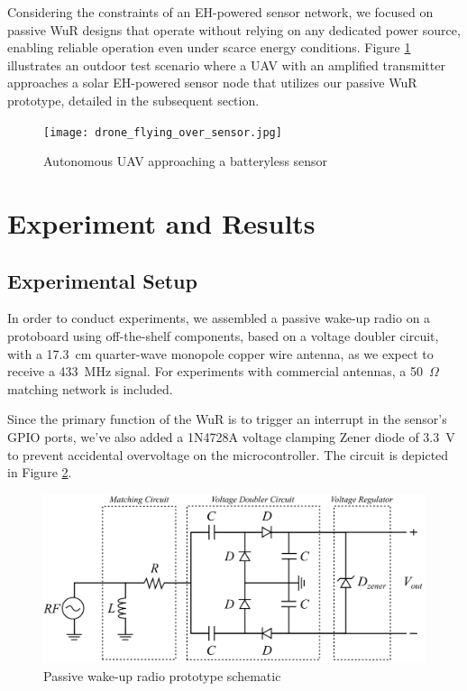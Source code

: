 \documentclass[conference]{IEEEtran}
\begin{document}
Considering the constraints of an EH-powered sensor network, we focused on passive WuR designs that operate without relying on any dedicated power source, enabling reliable operation even under scarce energy conditions. Figure \ref{fig:drone_over_sensor} illustrates an outdoor test scenario where a UAV with an amplified transmitter approaches a solar EH-powered sensor node that utilizes our passive WuR prototype, detailed in the subsequent section.

\begin{figure}[htbp]
  \centerline{\texttt{[image: drone\_flying\_over\_sensor.jpg]}}
  \caption{Autonomous UAV approaching a batteryless sensor}
  \label{fig:drone_over_sensor}
\end{figure}

\section{Experiment and Results}

\subsection{Experimental Setup}

In order to conduct experiments, we assembled a passive wake-up radio on a protoboard using off-the-shelf components, based on a voltage doubler circuit, with a 17.3~cm quarter-wave monopole copper wire antenna, as we expect to receive a 433~MHz signal. For experiments with commercial antennas, a 50~$\Omega$ matching network is included.

Since the primary function of the WuR is to trigger an interrupt in the sensor's GPIO ports, we've also added a 1N4728A voltage clamping Zener diode of 3.3~V to prevent accidental overvoltage on the microcontroller. The circuit is depicted in Figure \ref{fig:receiver}.

\begin{figure}[htbp]
  \centerline{\includegraphics[width=1\linewidth]{receiver.png}}
  \caption{Passive wake-up radio prototype schematic}
  \label{fig:receiver}
\end{figure}
\end{document}
